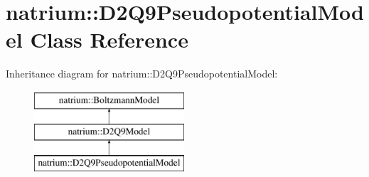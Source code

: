 \hypertarget{classnatrium_1_1D2Q9PseudopotentialModel}{\section{natrium\-:\-:D2\-Q9\-Pseudopotential\-Model Class Reference}
\label{classnatrium_1_1D2Q9PseudopotentialModel}
}
Inheritance diagram for natrium\-:\-:D2\-Q9\-Pseudopotential\-Model\-:\begin{figure}[H]
\begin{center}
\leavevmode
\includegraphics[height=3.000000cm]{classnatrium_1_1D2Q9PseudopotentialModel}
\end{center}
\end{figure}
